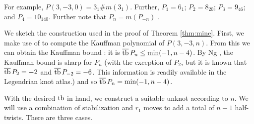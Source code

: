 For example, $P(3, -3, 0) = 3_1 \# m(3_1)$. Further, $P_1 = 6_1$; $P_2 = 8_{20}$; $P_3 = 9_{46}$; and $P_4 = 10_{140}$. Further note that $P_n = m(P_{-n})$ \cite{kawauchi}.

We sketch the construction used in the proof of Theorem \ref{thm:mine}. First, we make use of \cite{lu-zhong} to compute the Kauffman polynomial of $P(3, -3, n)$. From this we can obtain the Kauffman bound : it is $\overline{\operatorname{tb}}\,{P_n} \leq \text{min}(-1, n-4)$. By Ng \cite{ng}, the Kauffman bound is sharp for $P_n$ (with the exception of $P_2$, but it is known that $\overline{\operatorname{tb}}\, P_2 = -2$ and $\overline{\operatorname{tb}}\, P_{-2} = -6$. This information is readily available in the Legendrian knot atlas\cite{atlas}.) and so $\overline{\operatorname{tb}}\, P_n = \text{min} (-1, n-4)$.

With the desired $\operatorname{tb}$ in hand, we construct a suitable unknot according to $n$. We will use a combination of stabilization and $r_1$ moves to add a total of $n-1$ half-twists. There are three cases.
\pagebreak
